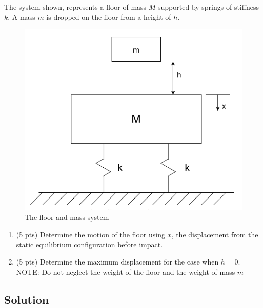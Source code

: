 \section{}

The system shown, represents a floor of mass $M$ supported by springs of stiffness $k$. A mass $m$ is
dropped on the floor from a height of $h$.
\begin{figure}[h]
    \centering
    \includegraphics[width=0.5\linewidth]{Questions/Figures/q5 problem diagram.png}
    \caption{The floor and mass system}
    \label{fig:q5-png}
\end{figure}
\begin{enumerate}[label=(\alph*)]
    \item (5 pts) Determine the motion of the floor using $x$, the displacement from the static
        equilibrium configuration before impact.
    \item (5 pts) Determine the maximum displacement for the case when $h = 0$. NOTE: Do not
        neglect the weight of the floor and the weight of mass $m$
\end{enumerate}

\subsection*{Solution}
